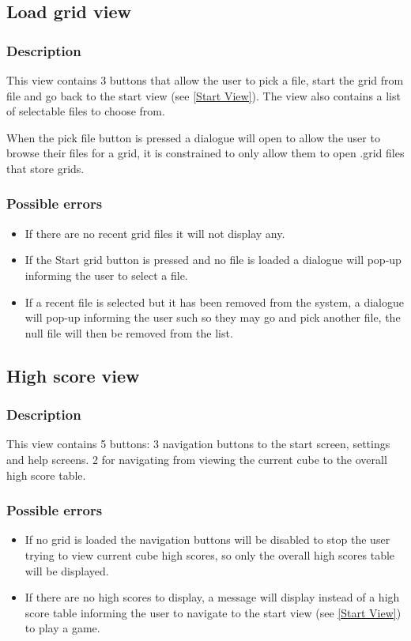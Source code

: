 \documentclass{project}
\begin{document}
\subsection{Load grid view} \label{Load View}
\subsubsection{Description}
This view contains 3 buttons that allow the user to pick a file, start the grid from file and go back to the start view (see \ref{Start View}). The view also contains a list of selectable files to choose from.

When the pick file button is pressed a dialogue will open to allow the user to browse their files for a grid, it is constrained to only allow them to open .grid files that store grids.
\subsubsection{Possible errors}
\begin{itemize}
\item If there are no recent grid files it will not display any.
\item If the Start grid button is pressed and no file is loaded a dialogue will pop-up informing the user to select a file.
\item If a recent file is selected but it has been removed from the system, a dialogue will pop-up informing the user such so they may go and pick another file, the null file will then be removed from the list.
\end{itemize}

\subsection{High score view} \label{High score View}
\subsubsection{Description}
This view contains 5 buttons: 3 navigation buttons to the start screen, settings and help screens. 2 for navigating from viewing the current cube to the overall high score table.
\subsubsection{Possible errors}
\begin{itemize}
\item If no grid is loaded the navigation buttons will be disabled to stop the user trying to view current cube high scores, so only the overall high scores table will be displayed.
\item If there are no high scores to display, a message will display instead of a high score table informing the user to navigate to the start view (see \ref{Start View}) to play a game.
\end{itemize}
\end{document}
